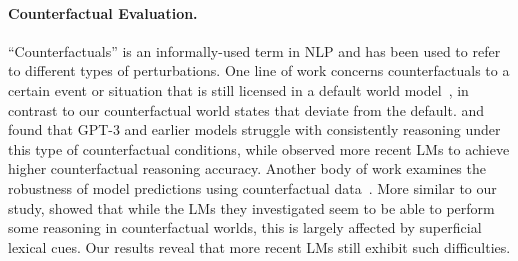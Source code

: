 \paragraph{Counterfactual Evaluation.}
``Counterfactuals'' is an informally-used term in NLP and has been used to refer to different types of perturbations. One line of work concerns counterfactuals to a certain event or situation that is still licensed in a default world model~, in contrast to our counterfactual world states that deviate from the default. 
\citet{qin-etal-2019-counterfactual} and \citet{frohberg-binder-2022-crass} found that GPT-3 and earlier models struggle with consistently reasoning under this type of counterfactual conditions, while \citet{kıcıman2023causal} observed more recent LMs to achieve higher counterfactual reasoning accuracy.
Another body of work examines the robustness of model predictions using counterfactual data~\citep{Kaushik2020Learning,kaushik2021explaining,gardner-etal-2020-evaluating}.
More similar to our study, \citet{li2023counterfactual} showed that while the LMs they investigated seem to be able to perform some reasoning in counterfactual worlds, this is largely affected by superficial lexical cues. Our results reveal that more recent LMs still exhibit such difficulties.
